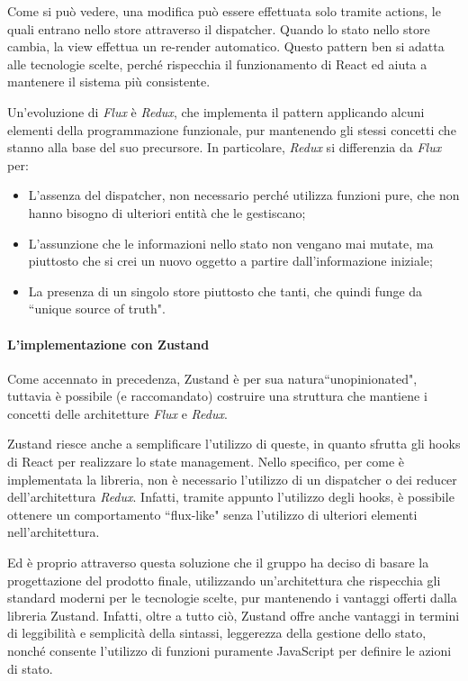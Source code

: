\noindent Come si può vedere, una modifica può essere effettuata solo tramite actions, le quali entrano nello store attraverso il dispatcher. Quando lo stato nello store cambia, la view effettua un re-render automatico. Questo pattern ben si adatta alle tecnologie scelte, perché rispecchia il funzionamento di React ed aiuta a mantenere il sistema più consistente.
\par Un'evoluzione di \textit{Flux} è \textit{Redux}, che implementa il pattern applicando alcuni elementi della programmazione funzionale, pur mantenendo gli stessi concetti che stanno alla base del suo precursore. In particolare, \textit{Redux} si differenzia da \textit{Flux} per:
\begin{itemize}
    \item L'assenza del dispatcher, non necessario perché utilizza funzioni pure, che non hanno bisogno di ulteriori entità che le gestiscano;
    \item L'assunzione che le informazioni nello stato non vengano mai mutate, ma piuttosto che si crei un nuovo oggetto a partire dall'informazione iniziale;
    \item La presenza di un singolo store piuttosto che tanti, che quindi funge da ``unique source of truth".
\end{itemize}

\paragraph{L'implementazione con Zustand}
Come accennato in precedenza, Zustand è per sua natura``unopinionated", tuttavia è possibile (e raccomandato) costruire una struttura che mantiene i concetti delle architetture \textit{Flux} e \textit{Redux}. 

Zustand riesce anche a semplificare l'utilizzo di queste, in quanto sfrutta gli hooks di React per realizzare lo state management. Nello specifico, per come è implementata la libreria, non è necessario l'utilizzo di un dispatcher o dei reducer dell'architettura \textit{Redux}. Infatti, tramite appunto l'utilizzo degli hooks, è possibile ottenere un comportamento ``flux-like" senza l'utilizzo di ulteriori elementi nell'architettura.

Ed è proprio attraverso questa soluzione che il gruppo ha deciso di basare la progettazione del prodotto finale, utilizzando un'architettura che rispecchia gli standard moderni per le tecnologie scelte, pur mantenendo i vantaggi offerti dalla libreria Zustand. Infatti, oltre a tutto ciò, Zustand offre anche vantaggi in termini di leggibilità e semplicità della sintassi, leggerezza della gestione dello stato, nonché consente l'utilizzo di funzioni puramente JavaScript per definire le azioni di stato.


